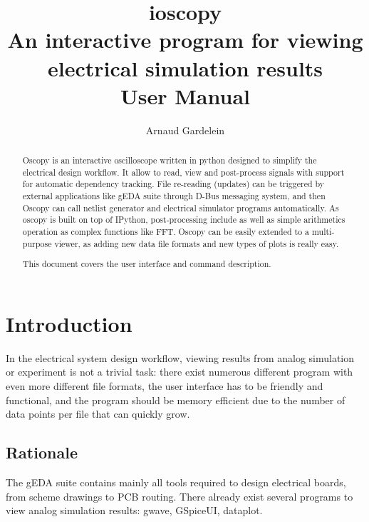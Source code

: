 \documentclass[a4paper,11pt]{article}
\title{{\sc ioscopy}\\An interactive program for viewing electrical simulation results\\User Manual}
\author{Arnaud Gardelein}
\begin{document}
\sf
\maketitle
\begin{abstract}

Oscopy is an interactive oscilloscope written in python designed to simplify the electrical design workflow.
It allow to read, view and post-process signals with support for automatic dependency tracking.
File re-reading (updates) can be triggered by external applications like gEDA suite through D-Bus messaging system, and then Oscopy can call netlist generator and electrical simulator programs automatically.
As oscopy is built on top of IPython, post-processing include as well as simple arithmetics operation as complex functions like FFT.
Oscopy can be easily extended to a multi-purpose viewer, as adding new data file formats and new types of plots is really easy.


This document covers the user interface and command description.
\end{abstract}

\section{Introduction}
\label{sec:intro}
In the electrical system design workflow, viewing results from analog simulation or experi\-ment is not a trivial task: there exist numerous different program with even more different file formats, the user interface has to be friendly and functional, and the program should be memory efficient due to the number of data points per file that can quickly grow.

\subsection{Rationale}
The gEDA suite contains mainly all tools required to design electrical boards, from scheme drawings to PCB routing.
There already exist several programs to view analog simulation results: gwave, GSpiceUI, dataplot.
\end{document}
